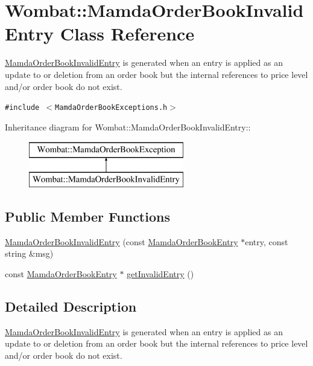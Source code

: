 \hypertarget{classWombat_1_1MamdaOrderBookInvalidEntry}{
\section{Wombat::Mamda\-Order\-Book\-Invalid\-Entry Class Reference}
\label{classWombat_1_1MamdaOrderBookInvalidEntry}
}
\hyperlink{classWombat_1_1MamdaOrderBookInvalidEntry}{Mamda\-Order\-Book\-Invalid\-Entry} is generated when an entry is applied as an update to or deletion from an order book but the internal references to price level and/or order book do not exist.  


{\tt \#include $<$Mamda\-Order\-Book\-Exceptions.h$>$}

Inheritance diagram for Wombat::Mamda\-Order\-Book\-Invalid\-Entry::\begin{figure}[H]
\begin{center}
\leavevmode
\includegraphics[height=2cm]{classWombat_1_1MamdaOrderBookInvalidEntry}
\end{center}
\end{figure}
\subsection*{Public Member Functions}
\begin{CompactItemize}
\item 
\hyperlink{classWombat_1_1MamdaOrderBookInvalidEntry_864ad9179bf446749e702f2f93811982}{Mamda\-Order\-Book\-Invalid\-Entry} (const \hyperlink{classWombat_1_1MamdaOrderBookEntry}{Mamda\-Order\-Book\-Entry} $\ast$entry, const string \&msg)
\item 
const \hyperlink{classWombat_1_1MamdaOrderBookEntry}{Mamda\-Order\-Book\-Entry} $\ast$ \hyperlink{classWombat_1_1MamdaOrderBookInvalidEntry_fcae5c2846ef5fb1b618d4bb22057bf0}{get\-Invalid\-Entry} ()
\end{CompactItemize}


\subsection{Detailed Description}
\hyperlink{classWombat_1_1MamdaOrderBookInvalidEntry}{Mamda\-Order\-Book\-Invalid\-Entry} is generated when an entry is applied as an update to or deletion from an order book but the internal references to price level and/or order book do not exist. 



